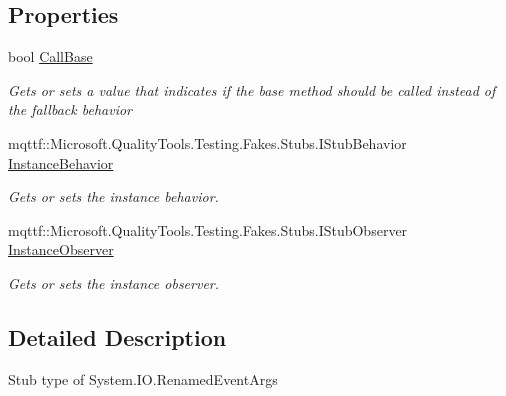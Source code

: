 \subsection*{Properties}
\begin{DoxyCompactItemize}
\item 
bool \hyperlink{class_system_1_1_i_o_1_1_fakes_1_1_stub_renamed_event_args_a6aabc29d9f41106fa99d84169772fbb3}{Call\-Base}
\begin{DoxyCompactList}\small\item\em Gets or sets a value that indicates if the base method should be called instead of the fallback behavior\end{DoxyCompactList}\item 
mqttf\-::\-Microsoft.\-Quality\-Tools.\-Testing.\-Fakes.\-Stubs.\-I\-Stub\-Behavior \hyperlink{class_system_1_1_i_o_1_1_fakes_1_1_stub_renamed_event_args_ae42511c4253eaa9776f129df3654e016}{Instance\-Behavior}
\begin{DoxyCompactList}\small\item\em Gets or sets the instance behavior.\end{DoxyCompactList}\item 
mqttf\-::\-Microsoft.\-Quality\-Tools.\-Testing.\-Fakes.\-Stubs.\-I\-Stub\-Observer \hyperlink{class_system_1_1_i_o_1_1_fakes_1_1_stub_renamed_event_args_ac66181b74cf0f7848474375351d8406b}{Instance\-Observer}
\begin{DoxyCompactList}\small\item\em Gets or sets the instance observer.\end{DoxyCompactList}\end{DoxyCompactItemize}


\subsection{Detailed Description}
Stub type of System.\-I\-O.\-Renamed\-Event\-Args



